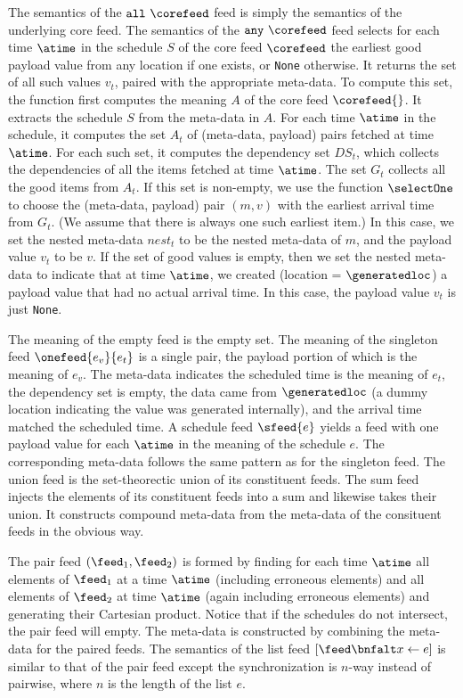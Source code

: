 The semantics of the $\mathtt{all}\ \corefeed$ feed is simply the semantics
of the underlying core feed.
The semantics of the $\mathtt{any}\ \corefeed$ feed selects for each
time $\atime$ in the schedule $S$ of the core feed $\corefeed$ the
earliest good payload value from any location if one exists, or
\texttt{None} otherwise.  It returns the set of all such values
$v_t$, paired with the appropriate meta-data.  
To compute this set, the function first computes
the meaning $A$ of the core feed $\corefeed{}$.  It extracts the
schedule $S$ from the meta-data in $A$.  For each time $\atime$ in the
schedule, it computes the set $A_t$ of (meta-data, payload) pairs
fetched at time $\atime$.  For each such set, it computes the
dependency set $DS_t$, which collects the dependencies of all the
items fetched at time $\atime$.  The set $G_t$ collects all the good
items from $A_t$. If this set is non-empty, we use the function 
$\selectOne$ to choose the (meta-data, payload) pair $(m,v)$ with the
earliest arrival time from $G_t$.  (We assume that there is always one
such earliest item.)  In this case, we set the nested
meta-data $nest_t$ to be the nested meta-data of $m$, and the payload
value $v_t$ to be $v$.  If the set of good values is empty, then we set the nested
meta-data to indicate that at time $\atime$, we created (location =
$\generatedloc$) a payload value that had no actual
arrival time.  In this case, the payload value $v_t$ is
just \texttt{None}. 

The meaning of the empty feed is the empty set.  
The meaning of the singleton feed $\onefeed{e_v}{e_t}$ is a single
pair, the payload portion of which is the meaning of $e_v$.  The
meta-data indicates the scheduled time is the meaning of $e_t$, the dependency
set is empty, the data came from $\generatedloc$ (a dummy location
indicating the value was generated internally), and the arrival time
matched the scheduled time. 
A schedule feed $\sfeed{e}$ yields a feed with one payload value for
each $\atime$ in the meaning of the schedule $e$.  The corresponding
meta-data follows the same pattern as for the singleton feed.  
The union feed is the set-theorectic union of its constituent
feeds. The sum feed injects the elements of its constituent
feeds into a sum and likewise takes their union.  It constructs
compound meta-data from the meta-data of the consituent feeds in the
obvious way.

The pair feed $(\feed_1,\feed_2)$ is formed by finding for each time
$\atime$ all elements
of $\feed_1$ at a time $\atime$ (including erroneous elements) and all
elements of $\feed_2$ at time $\atime$ (again including erroneous
elements) and generating their Cartesian product.  Notice that 
if the schedules do not intersect, the pair feed will empty.  The
meta-data is constructed by combining the meta-data for the paired
feeds.
The semantics of the list feed $[\feed \bnfalt x \leftarrow e ]$ is
similar to that of the pair feed except the synchronization is $n$-way
instead of pairwise, where $n$ is the length of the list $e$. 

